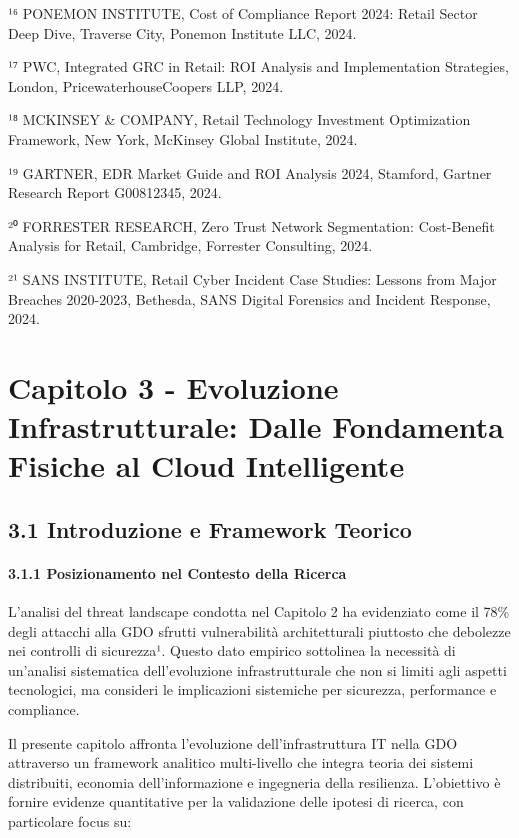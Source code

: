 \documentclass[12pt,a4paper,oneside]{book}
\begin{document}
¹⁶ PONEMON INSTITUTE, Cost of Compliance Report 2024: Retail Sector Deep
Dive, Traverse City, Ponemon Institute LLC, 2024.

¹⁷ PWC, Integrated GRC in Retail: ROI Analysis and Implementation
Strategies, London, PricewaterhouseCoopers LLP, 2024.

¹⁸ MCKINSEY \& COMPANY, Retail Technology Investment Optimization
Framework, New York, McKinsey Global Institute, 2024.

¹⁹ GARTNER, EDR Market Guide and ROI Analysis 2024, Stamford, Gartner
Research Report G00812345, 2024.

²⁰ FORRESTER RESEARCH, Zero Trust Network Segmentation: Cost-Benefit
Analysis for Retail, Cambridge, Forrester Consulting, 2024.

²¹ SANS INSTITUTE, Retail Cyber Incident Case Studies: Lessons from
Major Breaches 2020-2023, Bethesda, SANS Digital Forensics and Incident
Response, 2024.

\chapter{Capitolo 3 - Evoluzione Infrastrutturale: Dalle Fondamenta
Fisiche al Cloud
Intelligente}\label{capitolo-3---evoluzione-infrastrutturale-dalle-fondamenta-fisiche-al-cloud-intelligente}

\section{3.1 Introduzione e Framework
Teorico}\label{introduzione-e-framework-teorico}

\subsubsection{3.1.1 Posizionamento nel Contesto della
Ricerca}\label{posizionamento-nel-contesto-della-ricerca}

L'analisi del threat landscape condotta nel Capitolo 2 ha evidenziato
come il 78\% degli attacchi alla GDO sfrutti vulnerabilità
architetturali piuttosto che debolezze nei controlli di sicurezza¹.
Questo dato empirico sottolinea la necessità di un'analisi sistematica
dell'evoluzione infrastrutturale che non si limiti agli aspetti
tecnologici, ma consideri le implicazioni sistemiche per sicurezza,
performance e compliance.

Il presente capitolo affronta l'evoluzione dell'infrastruttura IT nella
GDO attraverso un framework analitico multi-livello che integra teoria
dei sistemi distribuiti, economia dell'informazione e ingegneria della
resilienza. L'obiettivo è fornire evidenze quantitative per la
validazione delle ipotesi di ricerca, con particolare focus su:
\end{document}
